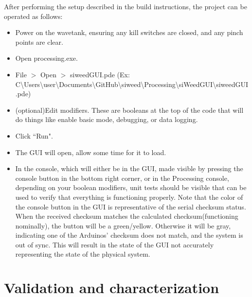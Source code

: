 \documentclass[11pt, letterpaper]{article}
\begin{document}
After performing the setup described in the build instructions, the project can be operated as follows:
\begin{itemize}
\item Power on the wavetank, ensuring any kill switches are closed, and any pinch points are clear.
\item Open processing.exe.
\item File $>$ Open $>$ siweedGUI.pde 
(Ex: C\textbackslash Users\textbackslash user\textbackslash Documents\textbackslash GitHub\textbackslash siweed\textbackslash Processing\textbackslash siWeedGUI\textbackslash siweedGUI.pde) 
\item (optional)Edit modifiers. These are booleans at the top of the code that will do things like enable basic mode, debugging, or data logging.
\item Click ``Run".
\item The GUI will open, allow some time for it to load.
\item In the console, which will either be in the GUI, made visible by pressing the console button in the bottom right corner, or in the Processing console, depending on your boolean modifiers, unit tests should be visible that can be used to verify that everything is functioning properly. 
Note that the color of the console button in the GUI is representative of the serial checksum status.
When the received checksum matches the calculated checksum(functioning nominally), the button will be a green/yellow.
Otherwise it will be gray, indicating one of the Arduinos' checksum does not match, and the system is out of sync. 
This will result in the state of the GUI not accurately representing the state of the physical system.
\end{itemize}

\section{Validation and characterization}
\end{document}
